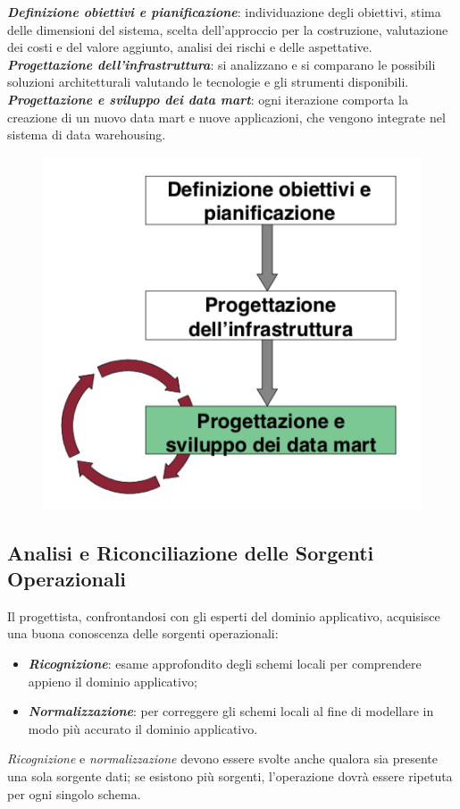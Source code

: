 \documentclass[a4paper, notitlepage, 9pt]{extreport}
\begin{document}
\begin{multicols}{2}
	\noindent
	\textit{\textbf{Definizione obiettivi e pianificazione}}: individuazione degli obiettivi, stima delle dimensioni del sistema, scelta dell'approccio per la costruzione, valutazione dei costi e del valore aggiunto, analisi dei rischi e delle aspettative.
	\\
	\textit{\textbf{Progettazione dell'infrastruttura}}: si analizzano e si comparano le possibili soluzioni architetturali valutando le tecnologie e gli strumenti disponibili.
	\\
	\textit{\textbf{Progettazione e sviluppo dei data mart}}: ogni iterazione comporta la creazione di un nuovo data mart e nuove applicazioni, che vengono integrate nel sistema di data warehousing.
	\columnbreak
	\begin{figure}[H]
		\centering
		\includegraphics[scale=0.45]{CicloSviluppo}
	\end{figure}
\end{multicols}

\subsection*{Analisi e Riconciliazione delle Sorgenti Operazionali}
Il progettista, confrontandosi con gli esperti del dominio applicativo, acquisisce una buona conoscenza delle sorgenti operazionali:
\begin{itemize}
	\item \textit{\textbf{Ricognizione}}: esame approfondito degli schemi locali per comprendere appieno il dominio applicativo;
	\item \textit{\textbf{Normalizzazione}}: per correggere gli schemi locali al fine di modellare in modo più accurato il dominio applicativo.
\end{itemize}
\textit{Ricognizione} e \textit{normalizzazione} devono essere svolte anche qualora sia presente una sola sorgente dati; se esistono più sorgenti, l’operazione dovrà essere ripetuta per ogni singolo schema.
\newline
\end{document}
